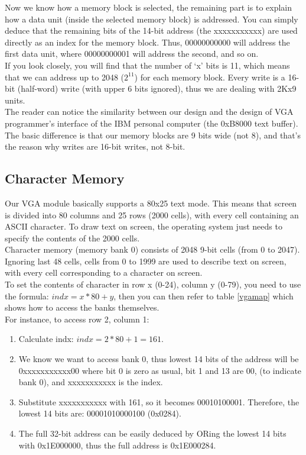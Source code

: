\documentclass[oneside]{book}
\begin{document}
Now we know how a memory block is selected, the remaining part is to explain
how a data unit (inside the selected memory block) is addressed. You can
simply deduce that the remaining bits of the 14-bit address (the xxxxxxxxxxx)
are used directly as an index for the memory block. Thus, 00000000000 will
address the first data unit, where 00000000001 will address the second,
and so on. \\

If you look closely, you will find that the number of `x' bits is 11,
which means that we can address up to 2048 ($2^{11}$) for each memory
block. Every write is a 16-bit (half-word) write (with upper 6 bits
ignored), thus we are dealing with 2Kx9 units.\\

The reader can notice the similarity between our design and the design
of VGA programmer's interface of the IBM personal computer (the 0xB8000 text
buffer). The basic difference is that our memory blocks are 9 bits wide 
(not 8), and that's the reason why writes are 16-bit writes, not 8-bit.

\subsection{Character Memory}

Our VGA module basically supports a 80x25 text mode. This means that screen
is divided into 80 columns and 25 rows (2000 cells), with every cell 
containing an ASCII character. To draw text on screen, the operating system
just needs to specify the contents of the 2000 cells.\\

Character memory (memory bank 0) consists of 2048 9-bit cells (from 0
to 2047). Ignoring last 48 cells, cells from 0 to 1999 are used to describe
text on screen, with every cell corresponding to a character on screen.\\

To set the contents of character in row x (0-24), column y (0-79), you
need to use the formula: $indx=x*80+y$, then you can then refer to table
\ref{vgamap} which shows how to access the banks themselves.\\

For instance, to access row 2, column 1:

\begin{enumerate}

\item Calculate indx: $indx=2*80+1=161$.
\item We know we want to access bank 0, thus lowest 14 bits of the address
      will be 0xxxxxxxxxxx00 where bit 0 is zero as usual, bit 1 and 13 are 00,
      (to indicate bank 0), and xxxxxxxxxxx is the index.
\item Substitute xxxxxxxxxxx with 161, so it becomes 00010100001. Therefore,
      the lowest 14 bits are: 00001010000100 (0x0284).
\item The full 32-bit address can be easily deduced by ORing the lowest 14 bits
      with 0x1E000000, thus the full address is 0x1E000284.

\end{enumerate}
\end{document}
